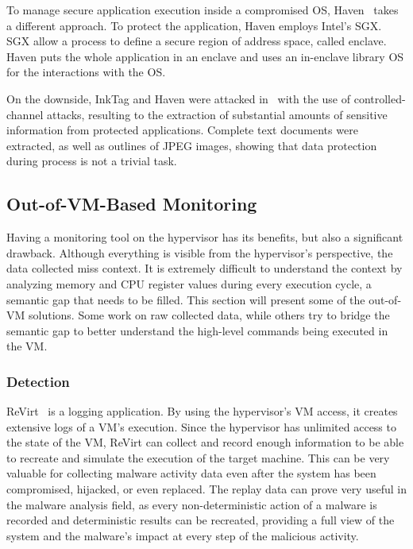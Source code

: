 \par To manage secure application execution inside a compromised \ac{OS}, Haven~\cite{baumann2015shielding} takes a different approach. To protect the application, Haven employs Intel's \ac{SGX}. \ac{SGX} allow a process to define a secure region of address space, called enclave. Haven puts the whole application in an enclave and uses an in-enclave library \ac{OS} for the interactions with the \ac{OS}.

\par On the downside, InkTag and Haven were attacked in~\cite{xu2015controlled} with the use of controlled-channel attacks, resulting to the extraction of substantial amounts of sensitive information from protected applications. Complete text documents were extracted, as well as outlines of JPEG images, showing that data protection during process is not a trivial task. 


\subsection{Out-of-\ac{VM}-Based Monitoring}\label{sub:outvm}
Having a monitoring tool on the hypervisor has its benefits, but also a significant drawback. Although everything is visible from the hypervisor's perspective, the data collected miss context. It is extremely difficult to understand the context by analyzing memory and \ac{CPU} register values during every execution cycle, a semantic gap that needs to be filled. This section will present some of the out-of-\ac{VM} solutions. Some work on raw collected data, while others try to bridge the semantic gap to better understand the high-level commands being executed in the \ac{VM}.

\subsubsection{Detection}

\par ReVirt~\cite{dunlap2002revirt} is a logging application. By using the hypervisor’s \ac{VM} access, it creates extensive logs of a \ac{VM}’s execution. Since the hypervisor has unlimited access to the state of the \ac{VM}, ReVirt can collect and record enough information to be able to recreate and simulate the execution of the target machine. This can be very valuable for collecting malware activity data even after the system has been compromised, hijacked, or even replaced. The replay data can prove very useful in the malware analysis field, as every non-deterministic action of a malware is recorded and deterministic results can be recreated, providing a full view of the system and the malware's impact at every step of the malicious activity.

